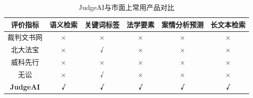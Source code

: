 
\begin{table}[ht]
\begin{tabular}{c|ccccc}
\hline
评价指标             & 语义检索       & 关键词标签      & 法学要素       & 案情分析预测     & 长文本检索      \\ \hline
裁判文书网            & ×          & ×          & ×          & ×          & ×          \\
北大法宝             & ×          & √          & ×          & ×          & ×          \\
威科先行             & ×          & ×          & ×          & ×          & ×          \\
无讼               & ×          & √          & ×          & ×          & ×          \\ \hline
\textbf{JudgeAI} & \textbf{√} & \textbf{√} & \textbf{√} & \textbf{√} & \textbf{√} \\
\hline
\end{tabular}
\caption{JudgeAI与市面上常用产品对比}
\label{background:compare}
\end{table}

